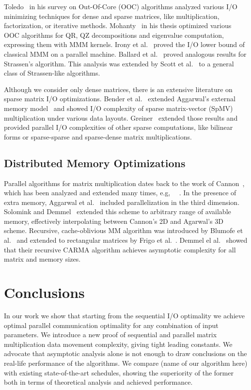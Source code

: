 \documentclass[sigplan,review,anonymous]{acmart}\settopmatter{printfolios=true,printccs=false,printacmref=false}
\begin{document}
Toledo~\cite{IOsurvey} in his survey on Out-Of-Core (OOC) algorithms analyzed 
various I/O minimizing techniques for dense and sparse matrices, like 
multiplication, factorization, or iterative methods. 
Mohanty~\cite{MohantyThesis} in his thesis optimized various OOC algorithms for 
QR, QZ decompositions and eigenvalue computation, expressing them with MMM 
kernels. Irony et 
al.~\cite{IronyMMM} proved the I/O lower bound of classical MMM on a parallel 
machine. Ballard et al.~\cite{strassenBounds} proved analogous results for 
Strassen's algorithm. This analysis was extended by Scott et 
al.~\cite{generalStrassenBounds} to a general class of Strassen-like algorithms.

Although we consider only dense matrices, there is an extensive literature on 
sparse matrix I/O optimizations. Bender et al.~\cite{SpMVIO} extended 
Aggarwal's external memory model~\cite{externalMem} and showed I/O complexity 
of sparse matrix-vector (SpMV) multiplication under various data layouts. 
Greiner~\cite{SpEverything} extended those results and provided parallel I/O 
complexities of other sparse computations, like bilinear forms or sparse-sparse 
and sparse-dense matrix multiplications.


\subsection{Distributed Memory Optimizations}
Parallel algorithms for matrix multiplication dates back to the work of 
Cannon~\cite{Cannon}, which has been analyzed and extended many times, e.g, 
~\cite{MManalysis}~\cite{generalCannon}. In the presence of extra memory, 
Aggarwal et al.~\cite{summa3d} included parallelization in the third dimension. 
Solomink and Demmel~\cite{25d} extended this scheme to arbitrary range of 
available memory, effectively interpolating between Cannon's 2D and Agarwal's 
3D scheme. Recursive, cache-oblivious MM algorithm was introduced by Blumofe 
et al.~\cite{recursiveMM} and extended to rectangular matrices by Frigo et 
al.~\cite{recursiveRectangularMM}. Demmel el al.~\cite{CARMA} showed that their 
recursive CARMA algorithm achieves asymptotic complexity for all matrix and 
memory sizes. 

\section{Conclusions}
In our work we show that starting from the sequential I/O optimality we achieve 
optimal parallel communication optimality for any combination of input 
parameters. We introduce a new proof of sequential and parallel matrix 
multiplication data movement complexity, giving tight leading constants. We 
advocate that asymptotic analysis alone is not enough to draw conclusions on 
the real-life performance of the algorithms. We 
compare (name of our algorithm here) with existing state-of-the-art schedules, 
showing the 
superiority of the former both in terms of theoretical analysis and achieved 
performance.
\end{document}
